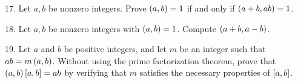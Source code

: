 \begin{mdframed}[style=darkAnswer,frametitle={Joe Starr}]
    
\end{mdframed}
\newpage
\begin{mdframed}[style=darkQuesion]
17. Let $a,b$ be nonzero integers. Prove $\left(a,b\right)=1$ if and only if 
$\left(a+b,ab\right)=1$. 
\end{mdframed}

\begin{mdframed}[style=darkAnswer,frametitle={Joe Starr}]
    
\end{mdframed}
\newpage
\begin{mdframed}[style=darkQuesion]
18. Let $a,b$ be nonzero integers with $\left(a,b\right)=1$. Compute $\left(a+b,a-b\right)$. 
\end{mdframed}

\begin{mdframed}[style=darkAnswer,frametitle={Joe Starr}]
    
\end{mdframed}
\newpage
\begin{mdframed}[style=darkQuesion]
19. Let $a$ and $b$ be positive integers, and let $m$ be an integer such that 
$ab=m\left(a,b\right)$. Without using the prime factorization theorem, prove that 
$\left(a,b\right)\left[a,b\right]=ab$ by verifying that $m$ satisfies the necessary properties
of $\left[a,b\right]$.
\end{mdframed}

